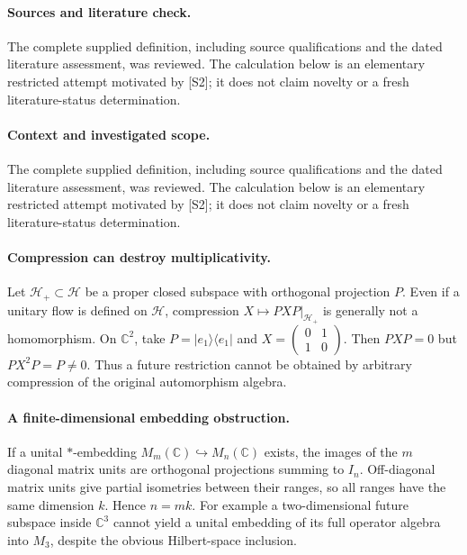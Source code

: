 \documentclass[11pt]{article}
\begin{document}
\paragraph{Sources and literature check.}
The complete supplied definition, including source qualifications and the dated literature assessment, was reviewed. The calculation below is an elementary restricted attempt motivated by [S2]; it does not claim novelty or a fresh literature-status determination.

\paragraph{Context and investigated scope.} The complete supplied definition, including source qualifications and the dated literature assessment, was reviewed. The calculation below is an elementary restricted attempt motivated by [S2]; it does not claim novelty or a fresh literature-status determination.

\paragraph{Compression can destroy multiplicativity.} Let $\mathcal H_+\subset\mathcal H$ be a proper closed subspace with orthogonal projection $P$. Even if a unitary flow is defined on $\mathcal H$, compression $X\mapsto PXP|_{\mathcal H_+}$ is generally not a homomorphism. On $\mathbb C^2$, take $P=|e_1\rangle\langle e_1|$ and $X=\left(\begin{smallmatrix}0&1\\1&0\end{smallmatrix}\right)$. Then $PXP=0$ but $PX^2P=P\ne0$. Thus a future restriction cannot be obtained by arbitrary compression of the original automorphism algebra.

\paragraph{A finite-dimensional embedding obstruction.} If a unital $*$-embedding $M_m(\mathbb C)\hookrightarrow M_n(\mathbb C)$ exists, the images of the $m$ diagonal matrix units are orthogonal projections summing to $I_n$. Off-diagonal matrix units give partial isometries between their ranges, so all ranges have the same dimension $k$. Hence $n=mk$. For example a two-dimensional future subspace inside $\mathbb C^3$ cannot yield a unital embedding of its full operator algebra into $M_3$, despite the obvious Hilbert-space inclusion.
\end{document}
